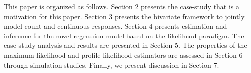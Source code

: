 \documentclass[useAMS,referee]{biom}
\begin{document}
This paper is organized as follows. Section 2 presents the case-study that is a motivation for this paper. Section 3 presents the bivariate framework to jointly model count and continuous responses.  Section 4 presents estimation and inference for the novel regression model based on the likelihood paradigm. The case study analysis and results are presented in Section 5. The properties of the maximum likelihood and profile likelihood estimators are assessed in Section 6 through simulation
studies. Finally, we present discussion in Section 7.















\end{document}
